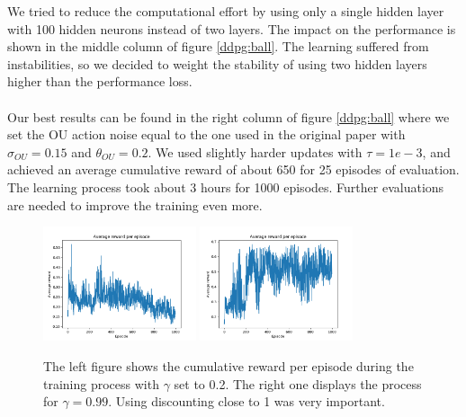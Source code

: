 \noindent We tried to reduce the computational effort by using only a single hidden layer with 100 hidden neurons instead of two layers. The impact on the performance is shown in the middle column of figure \ref{ddpg:ball}. The learning suffered from instabilities, so we decided to weight the stability of using two hidden layers higher than the performance loss.\\
\\
Our best results can be found in the right column of figure \ref{ddpg:ball} where we set the OU action noise equal to the one used in the original paper with $\sigma_{OU}=0.15$ and $\theta_{OU}=0.2$. We used slightly harder updates with $\tau=1e-3$, and achieved an average cumulative reward of about 650 for 25 episodes of evaluation. The learning process took about 3 hours for 1000 episodes. Further evaluations are needed to improve the training even more.
\begin{figure} [H]
	\centering
	\includegraphics[width=0.4\textwidth]{plots/ddpg_ball_low_gamma.png}
	\includegraphics[width=0.4\textwidth]{plots/ddpg_ball_high_gamma.png}
	\caption{The left figure shows the cumulative reward per episode during the training process with $\gamma$ set to 0.2. The right one displays the process for $\gamma=0.99$. Using discounting close to 1 was very important.}
	\label{ddpg:ball:gamma}
\end{figure}

